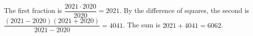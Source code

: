 The first fraction is $\dfrac{2021\cdot2020}{2020}=2021$. By the difference of squares, the second is $\dfrac{(2021-2020)(2021+2020)}{2021-2020}=4041$. The sum is $2021+4041=\boxed{6062}$.
